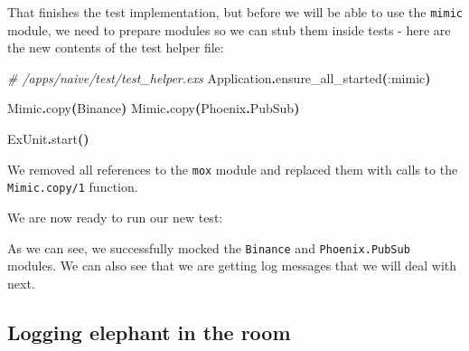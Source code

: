 \documentclass[
  oneside]{book}
\newenvironment{Shaded}{\begin{snugshade}}{\end{snugshade}}
\newcommand{\BuiltInTok}[1]{#1}
\newcommand{\CommentTok}[1]{\textcolor[rgb]{0.56,0.35,0.01}{\textit{#1}}}
\newcommand{\ConstantTok}[1]{\textcolor[rgb]{0.56,0.35,0.01}{#1}}
\newcommand{\ErrorTok}[1]{\textcolor[rgb]{0.64,0.00,0.00}{\textbf{#1}}}
\newcommand{\ExtensionTok}[1]{#1}
\newcommand{\FunctionTok}[1]{\textcolor[rgb]{0.13,0.29,0.53}{\textbf{#1}}}
\newcommand{\KeywordTok}[1]{\textcolor[rgb]{0.13,0.29,0.53}{\textbf{#1}}}
\newcommand{\NormalTok}[1]{#1}
\newcommand{\OperatorTok}[1]{\textcolor[rgb]{0.81,0.36,0.00}{\textbf{#1}}}
\newcommand{\PreprocessorTok}[1]{\textcolor[rgb]{0.56,0.35,0.01}{\textit{#1}}}
\newcommand{\SpecialStringTok}[1]{\textcolor[rgb]{0.31,0.60,0.02}{#1}}
\newcommand{\VariableTok}[1]{\textcolor[rgb]{0.00,0.00,0.00}{#1}}
\begin{document}
That finishes the test implementation, but before we will be able to use the \texttt{mimic} module, we need to prepare modules so we can stub them inside tests - here are the new contents of the test helper file:

\begin{Shaded}
\begin{Highlighting}[]
\CommentTok{\# /apps/naive/test/test\_helper.exs}
\ConstantTok{Application}\OperatorTok{.}\NormalTok{ensure\_all\_started}\FunctionTok{(}\VariableTok{:mimic}\FunctionTok{)}

\ConstantTok{Mimic}\OperatorTok{.}\NormalTok{copy}\FunctionTok{(}\ConstantTok{Binance}\FunctionTok{)}
\ConstantTok{Mimic}\OperatorTok{.}\NormalTok{copy}\FunctionTok{(}\ConstantTok{Phoenix}\OperatorTok{.}\ConstantTok{PubSub}\FunctionTok{)}

\ConstantTok{ExUnit}\OperatorTok{.}\NormalTok{start}\FunctionTok{()}
\end{Highlighting}
\end{Shaded}

We removed all references to the \texttt{mox} module and replaced them with calls to the \texttt{Mimic.copy/1} function.

We are now ready to run our new test:

\begin{Shaded}
\end{Shaded}

As we can see, we successfully mocked the \texttt{Binance} and \texttt{Phoenix.PubSub} modules. We can also see that we are getting log messages that we will deal with next.

\subsection{Logging elephant in the room}\label{logging-elephant-in-the-room}
\end{document}
